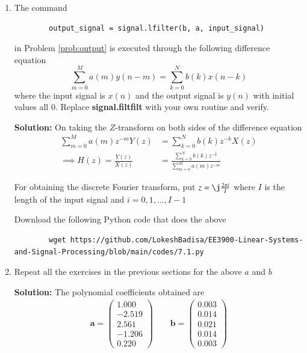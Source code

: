 \documentclass[journal,12pt,twocolumn]{IEEEtran}
\newcommand{\solution}{\noindent \textbf{Solution: }}
\providecommand{\brak}[1]{\ensuremath{\left(#1\right)}}
\let\vec\mathbf
\numberwithin{equation}{section}
\renewcommand\thesection{\arabic{section}}
\newcommand{\myvec}[1]{\ensuremath{\begin{pmatrix}#1\end{pmatrix}}}
\begin{document}
	\begin{enumerate}[label=\thesection.\arabic*]
	\item The command
	\begin{lstlisting}
		output_signal = signal.lfilter(b, a, input_signal)
	\end{lstlisting}
	in Problem \ref{prob:output} is executed through the following difference equation
	\begin{equation}
		\label{eq:iir_filter_gen}
 		\sum _{m=0}^{M}a\brak{m}y\brak{n-m}=\sum _{k=0}^{N}b\brak{k}x\brak{n-k}
	\end{equation}
	where the input signal is $x(n)$ and the output signal is $y(n)$ with initial values all 0. Replace \textbf{signal.filtfilt} with your own routine and verify.
	
	\solution On taking the $Z$-transform on both sides of the difference equation
	\begin{align}
		\sum _{m=0}^{M}a\brak{m} z^{-m} Y(z) &= \sum _{k=0}^{N}b\brak{k} z^{-k} X(z) \\
		\implies H(z) = \frac{Y(z)}{X(z)} &= \frac{\sum _{k=0}^{N}b\brak{k} z^{-k}}{\sum _{m=0}^{M}a\brak{m} z^{-m	}}
	\end{align}
	
	For obtaining the discrete Fourier transform, put $z = \j \frac{2\pi i}{I}$ where $I$ is the length of the input signal and $i = 0, 1, \ldots, I-1$
	
	Download the following Python code that does the above
	\begin{lstlisting}
		wget https://github.com/LokeshBadisa/EE3900-Linear-Systems-and-Signal-Processing/blob/main/codes/7.1.py
	\end{lstlisting}
	
	\item Repeat all the exercises in the previous sections for the above $a$ and $b$
	
	\solution The polynomial coefficients obtained are
	\begin{align}
		\vec{a} = \myvec{1.000 \\ -2.519 \\ 2.561 \\ -1.206 \\ 0.220} \qquad
		\vec{b} = \myvec{0.003 \\ 0.014 \\ 0.021 \\ 0.014 \\ 0.003}
	\end{align}
	

\end{enumerate}
\end{document}
